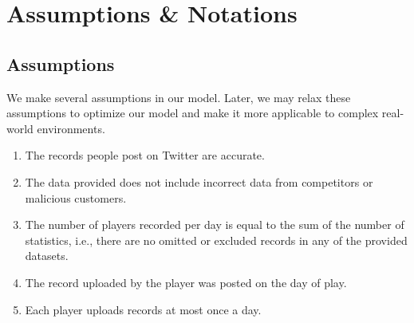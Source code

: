 \documentclass[12pt]{article}  %
\begin{document}
\section{Assumptions \& Notations}
\subsection{Assumptions}
We make several assumptions in our model. Later, we may relax these assumptions to optimize our model and make it more applicable to complex real-world environments.
\begin{enumerate}
    \item The records people post on Twitter are accurate.
    \item The data provided does not include incorrect data from competitors or malicious customers.
    \item The number of players recorded per day is equal to the sum of the number of statistics, i.e., there are no omitted or excluded records in any of the provided datasets.
    \item The record uploaded by the player was posted on the day of play.
    \item Each player uploads records at most once a day.
\end{enumerate}
\end{document}
